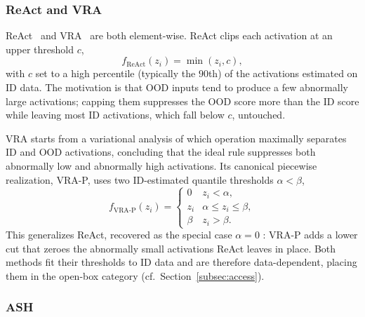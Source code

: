 \documentclass[a4paper]{article}
\begin{document}
\subsubsection{ReAct and VRA}
\label{subsec:react-vra}

ReAct~\citep{react} and VRA~\citep{vra} are both element-wise. ReAct clips each
activation at an upper threshold $c$,
\begin{equation}
f_{\mathrm{ReAct}}(z_i) = \min(z_i, c),
\end{equation}
with $c$ set to a high percentile (typically the $90$th) of the activations
estimated on ID data. The motivation is that OOD inputs tend to produce a few
abnormally large activations; capping them suppresses the OOD score more than the ID
score while leaving most ID activations, which fall below $c$, untouched.

VRA starts from a variational analysis of which operation maximally separates ID and
OOD activations, concluding that the ideal rule suppresses both abnormally low and
abnormally high activations. Its canonical piecewise realization, VRA-P, uses two
ID-estimated quantile thresholds $\alpha < \beta$,
\begin{equation}
f_{\mathrm{VRA\text{-}P}}(z_i) =
\begin{cases}
0 & z_i < \alpha, \\
z_i & \alpha \leq z_i \leq \beta, \\
\beta & z_i > \beta .
\end{cases}
\end{equation}
This generalizes ReAct, recovered as the special case $\alpha = 0$ \cite{vra}: VRA-P
adds a lower cut that zeroes the abnormally small activations ReAct leaves in place.
Both methods fit their thresholds to ID data and are therefore data-dependent,
placing them in the open-box category (cf.\ Section~\ref{subsec:access}).

\subsubsection{ASH}
\label{subsec:ash}
\end{document}
